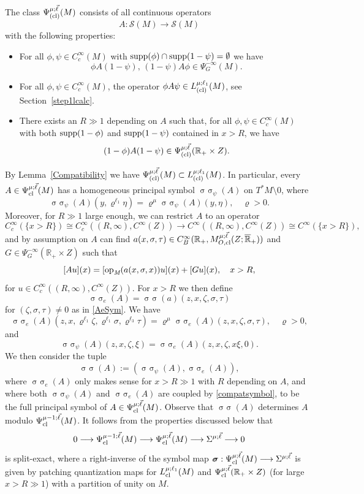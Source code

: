 \documentclass[reqno]{amsart}
\numberwithin{equation}{section}
\theoremstyle{definition}
\def\R{\mathbb R}
\def\S{\mathscr S}
\def\opm{\textup{op}_{\textit{M}}}
\DeclareMathOperator{\sym}{ \sigma\!\!\!\sigma}
\begin{document}
The class $\Psi^{\mu;\vec{\ell}}_{\textup{(cl)}}(M)$ consists of all continuous operators
$$
A : \S(M) \to \S(M)
$$
with the following properties:
\begin{itemize}
\item For all $\phi,\psi \in C_c^{\infty}(M)$ with $\textup{supp}(\phi)\cap\textup{supp}(1-\psi) = \emptyset$ we have
$$
\phi A (1 - \psi),\, (1-\psi) A \phi \in \Psi^{-\infty}_G(M).
$$
\item For all $\phi,\psi \in C_c^{\infty}(M)$, the operator $\phi A \psi \in L^{\mu;\ell_1}_{\textup{(cl)}}(M)$, see Section~\ref{step1lcalc}.
\item There exists an $R \gg 1$ depending on $A$ such that, for all $\phi,\psi \in C_c^{\infty}(M)$ with both $\textup{supp}(1-\phi)$ and $\textup{supp}(1-\psi)$ contained in $x > R$, we have
$$
(1-\phi)A(1-\psi) \in \Psi^{\mu;\vec{\ell}}_{\textup{(cl)}}(\R_+\times Z).
$$ 
\end{itemize}
By Lemma~\ref{Compatibility} we have $\Psi^{\mu;\vec{\ell}}_{\textup{(cl)}}(M) \subset L^{\mu;\ell_1}_{\textup{(cl)}}(M)$. In particular, every $A \in \Psi^{\mu;\vec{\ell}}_{\textup{cl}}(M)$ has a homogeneous principal symbol $\sym_{\psi}(A)$ on $T^*M \setminus 0$, where
$$
\sym_{\psi}(A)(y,\varrho^{\ell_1}\eta) = \varrho^{\mu}\sym_{\psi}(A)(y,\eta), \quad \varrho > 0.
$$
Moreover, for $R \gg 1$ large enough, we can restrict $A$ to an operator
$$
C_c^{\infty}(\{x > R\}) \cong C_c^{\infty}((R,\infty),C^{\infty}(Z)) \to C^{\infty}((R,\infty),C^{\infty}(Z)) \cong C^{\infty}(\{x > R\}),
$$
and by assumption on $A$ can find $a(x,\sigma,\tau) \in C_B^{\infty}(\R_+,M_{O,\textup{cl}}^{\mu;\vec{\ell}}(Z;\overline{\R}_+))$ and $G \in \Psi^{-\infty}_G(\R_+\times Z)$ such that
$$
[Au](x) = [\opm(a(x,\sigma,x))u](x) + [Gu](x), \quad x > R,
$$
for $u \in C_c^{\infty}((R,\infty),C^{\infty}(Z))$. For $x > R$ we then define
$$
\sym_e(A) = \sym(a)(z,x,\zeta,\sigma,\tau)
$$
for $(\zeta,\sigma,\tau) \neq 0$ as in \eqref{AeSym}. We have
$$
\sym_e(A)(z,x,\varrho^{\ell_1}\zeta,\varrho^{\ell_1}\sigma,\varrho^{\ell_3}\tau) = \varrho^{\mu}\sym_e(A)(z,x,\zeta,\sigma,\tau), \quad \varrho > 0,
$$
and
\begin{equation}\label{compatsymbol}
\sym_{\psi}(A)(z,x,\zeta,\xi) = \sym_e(A)(z,x,\zeta,x\xi,0).
\end{equation}
We then consider the tuple
$$
\sym(A):= (\sym_{\psi}(A),\sym_e(A)),
$$
where $\sym_e(A)$ only makes sense for $x > R \gg 1$ with $R$ depending on $A$, and where both $\sym_{\psi}(A)$ and $\sym_e(A)$ are coupled by \eqref{compatsymbol}, to be the full principal symbol of $A \in \Psi^{\mu;\vec{\ell}}_{\textup{cl}}(M)$. Observe that $\sym(A)$ determines $A$ modulo $\Psi^{\mu-1;\vec{\ell}}_{\textup{cl}}(M)$. It follows from the properties discussed below that
$$
0 \longrightarrow \Psi^{\mu-1;\vec{\ell}}_{\textup{cl}}(M) \longrightarrow \Psi^{\mu;\vec{\ell}}_{\textup{cl}}(M) \longrightarrow \Sigma^{\mu;\vec{\ell}} \longrightarrow 0
$$
is split-exact, where a right-inverse of the symbol map $\sym : \Psi^{\mu;\vec{\ell}}_{\textup{cl}}(M) \longrightarrow \Sigma^{\mu;\vec{\ell}}$ is given by patching quantization maps for $L^{\mu;\ell_1}_{\textup{cl}}(M)$ and $\Psi^{\mu;\vec{\ell}}_{\textup{cl}}(\R_+\times Z)$ (for large $x > R \gg 1$) with a partition of unity on $M$.
\end{document}
